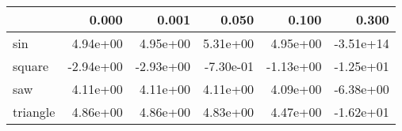 \begin{tabular}{lrrrrr}
\toprule
{} &     0.000 &     0.001 &     0.050 &     0.100 &     0.300 \\
\midrule
sin      &  4.94e+00 &  4.95e+00 &  5.31e+00 &  4.95e+00 & -3.51e+14 \\
square   & -2.94e+00 & -2.93e+00 & -7.30e-01 & -1.13e+00 & -1.25e+01 \\
saw      &  4.11e+00 &  4.11e+00 &  4.11e+00 &  4.09e+00 & -6.38e+00 \\
triangle &  4.86e+00 &  4.86e+00 &  4.83e+00 &  4.47e+00 & -1.62e+01 \\
\bottomrule
\end{tabular}
